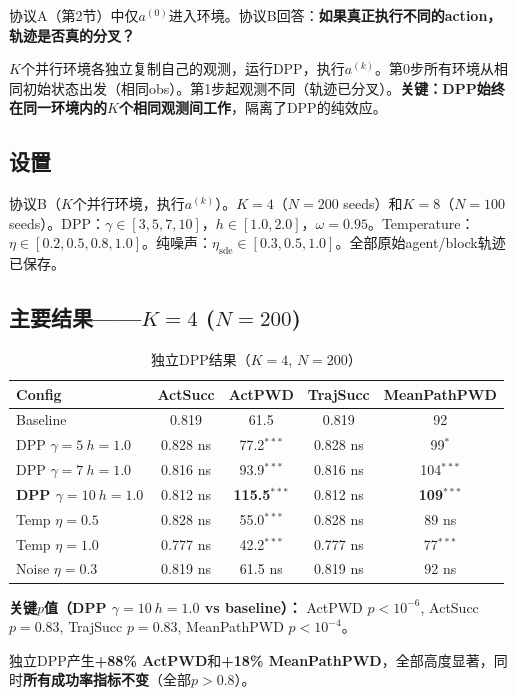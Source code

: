 \documentclass[11pt]{article}
\begin{document}
协议A（第2节）中仅$a^{(0)}$进入环境。协议B回答：\textbf{如果真正执行不同的action，轨迹是否真的分叉？}

$K$个并行环境各独立复制自己的观测，运行DPP，执行$a^{(k)}$。第0步所有环境从相同初始状态出发（相同obs）。第1步起观测不同（轨迹已分叉）。\textbf{关键：DPP始终在同一环境内的$K$个相同观测间工作}，隔离了DPP的纯效应。

\subsection{设置}

协议B（$K$个并行环境，执行$a^{(k)}$）。$K=4$（$N=200$ seeds）和$K=8$（$N=100$ seeds）。DPP：$\gamma \in [3, 5, 7, 10]$，$h \in [1.0, 2.0]$，$\omega=0.95$。Temperature：$\eta \in [0.2, 0.5, 0.8, 1.0]$。纯噪声：$\eta_{\text{sde}} \in [0.3, 0.5, 1.0]$。全部原始agent/block轨迹已保存。

\subsection{主要结果——$K=4$ ($N=200$)}

\begin{table}[h]
\centering
\caption{独立DPP结果（$K=4$, $N=200$）}
\begin{tabular}{lcccc}
\toprule
Config & ActSucc & ActPWD & TrajSucc & MeanPathPWD \\
\midrule
Baseline & 0.819 & 61.5 & 0.819 & 92 \\
DPP $\gamma{=}5\ h{=}1.0$ & 0.828 ns & 77.2$^{***}$ & 0.828 ns & 99$^{*}$ \\
DPP $\gamma{=}7\ h{=}1.0$ & 0.816 ns & 93.9$^{***}$ & 0.816 ns & 104$^{***}$ \\
\textbf{DPP $\gamma{=}10\ h{=}1.0$} & 0.812 ns & \textbf{115.5}$^{***}$ & 0.812 ns & \textbf{109}$^{***}$ \\
Temp $\eta{=}0.5$ & 0.828 ns & 55.0$^{***}$ & 0.828 ns & 89 ns \\
Temp $\eta{=}1.0$ & 0.777 ns & 42.2$^{***}$ & 0.777 ns & 77$^{***}$ \\
Noise $\eta{=}0.3$ & 0.819 ns & 61.5 ns & 0.819 ns & 92 ns \\
\bottomrule
\end{tabular}
\end{table}

\textbf{关键$p$值（DPP $\gamma{=}10\ h{=}1.0$ vs baseline）：}
ActPWD $p < 10^{-6}$, ActSucc $p = 0.83$, TrajSucc $p = 0.83$, MeanPathPWD $p < 10^{-4}$。

独立DPP产生\textbf{+88\% ActPWD}和\textbf{+18\% MeanPathPWD}，全部高度显著，同时\textbf{所有成功率指标不变}（全部$p > 0.8$）。
\end{document}
